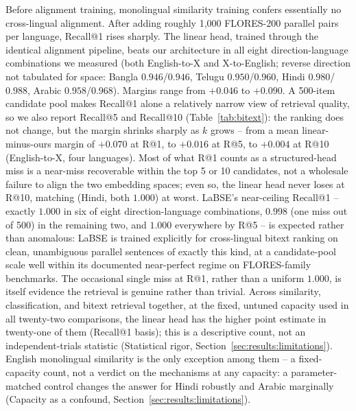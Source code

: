 \documentclass[manuscript]{acmart}
\begin{document}
Before alignment training, monolingual similarity training confers essentially no cross-lingual alignment. After adding roughly 1,000 FLORES-200 parallel pairs per language, Recall@1 rises sharply. The linear head, trained through the identical alignment pipeline, beats our architecture in all eight direction-language combinations we measured (both English-to-X and X-to-English; reverse direction not tabulated for space: Bangla $0.946$/$0.946$, Telugu $0.950$/$0.960$, Hindi $0.980$/$0.988$, Arabic $0.958$/$0.968$). Margins range from $+0.046$ to $+0.090$. A 500-item candidate pool makes Recall@1 alone a relatively narrow view of retrieval quality, so we also report Recall@5 and Recall@10 (Table~\ref{tab:bitext}): the ranking does not change, but the margin shrinks sharply as $k$ grows -- from a mean linear-minus-ours margin of $+0.070$ at R@1, to $+0.016$ at R@5, to $+0.004$ at R@10 (English-to-X, four languages). Most of what R@1 counts as a structured-head miss is a near-miss recoverable within the top 5 or 10 candidates, not a wholesale failure to align the two embedding spaces; even so, the linear head never loses at R@10, matching (Hindi, both $1.000$) at worst. LaBSE's near-ceiling Recall@1 -- exactly $1.000$ in six of eight direction-language combinations, $0.998$ (one miss out of 500) in the remaining two, and $1.000$ everywhere by R@5 -- is expected rather than anomalous: LaBSE is trained explicitly for cross-lingual bitext ranking on clean, unambiguous parallel sentences of exactly this kind, at a candidate-pool scale well within its documented near-perfect regime on FLORES-family benchmarks. The occasional single miss at R@1, rather than a uniform $1.000$, is itself evidence the retrieval is genuine rather than trivial. Across similarity, classification, and bitext retrieval together, at the fixed, untuned capacity used in all twenty-two comparisons, the linear head has the higher point estimate in twenty-one of them (Recall@1 basis); this is a descriptive count, not an independent-trials statistic (Statistical rigor, Section~\ref{sec:results:limitations}). English monolingual similarity is the only exception among them -- a fixed-capacity count, not a verdict on the mechanisms at any capacity: a parameter-matched control changes the answer for Hindi robustly and Arabic marginally (Capacity as a confound, Section~\ref{sec:results:limitations}).
\end{document}
